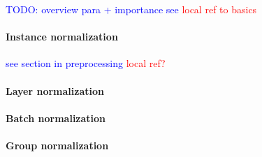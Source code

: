 \textcolor{blue}{TODO: overview para + importance see \textcolor{red}{local ref to basics}}

\paragraph{Instance normalization}

\textcolor{blue}{see section in preprocessing \textcolor{red}{local ref?}}


\paragraph{Layer normalization}


\paragraph{Batch normalization}


\paragraph{Group normalization}

